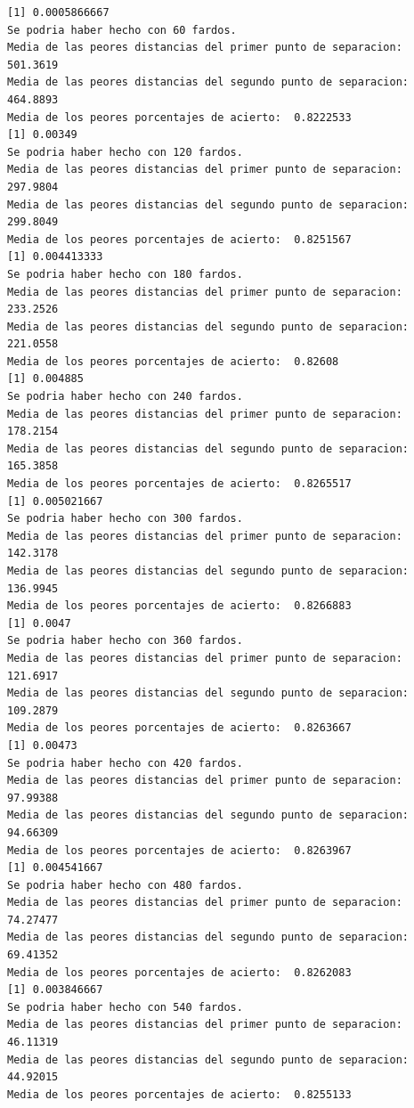 \documentclass{article}
\begin{document}
\begin{lstlisting}[label={lst:label}]
[1] 0.0005866667
Se podria haber hecho con 60 fardos.
Media de las peores distancias del primer punto de separacion:  501.3619 
Media de las peores distancias del segundo punto de separacion:  464.8893 
Media de los peores porcentajes de acierto:  0.8222533 
[1] 0.00349
Se podria haber hecho con 120 fardos.
Media de las peores distancias del primer punto de separacion:  297.9804 
Media de las peores distancias del segundo punto de separacion:  299.8049 
Media de los peores porcentajes de acierto:  0.8251567 
[1] 0.004413333
Se podria haber hecho con 180 fardos.
Media de las peores distancias del primer punto de separacion:  233.2526 
Media de las peores distancias del segundo punto de separacion:  221.0558 
Media de los peores porcentajes de acierto:  0.82608 
[1] 0.004885
Se podria haber hecho con 240 fardos.
Media de las peores distancias del primer punto de separacion:  178.2154 
Media de las peores distancias del segundo punto de separacion:  165.3858 
Media de los peores porcentajes de acierto:  0.8265517 
[1] 0.005021667
Se podria haber hecho con 300 fardos.
Media de las peores distancias del primer punto de separacion:  142.3178 
Media de las peores distancias del segundo punto de separacion:  136.9945 
Media de los peores porcentajes de acierto:  0.8266883 
[1] 0.0047
Se podria haber hecho con 360 fardos.
Media de las peores distancias del primer punto de separacion:  121.6917 
Media de las peores distancias del segundo punto de separacion:  109.2879 
Media de los peores porcentajes de acierto:  0.8263667 
[1] 0.00473
Se podria haber hecho con 420 fardos.
Media de las peores distancias del primer punto de separacion:  97.99388 
Media de las peores distancias del segundo punto de separacion:  94.66309 
Media de los peores porcentajes de acierto:  0.8263967 
[1] 0.004541667
Se podria haber hecho con 480 fardos.
Media de las peores distancias del primer punto de separacion:  74.27477 
Media de las peores distancias del segundo punto de separacion:  69.41352 
Media de los peores porcentajes de acierto:  0.8262083 
[1] 0.003846667
Se podria haber hecho con 540 fardos.
Media de las peores distancias del primer punto de separacion:  46.11319 
Media de las peores distancias del segundo punto de separacion:  44.92015 
Media de los peores porcentajes de acierto:  0.8255133 
\end{lstlisting}

\newpage
{}


\end{document}
